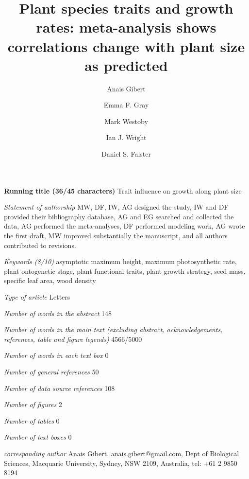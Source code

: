 \documentclass[a4paper]{article}\usepackage[]{graphicx}\usepackage[]{color}
\begin{document}
\newpage

\title{Plant species traits and growth rates: meta-analysis shows correlations change with plant size as predicted}

\author[1]{Anais Gibert}
\author[1]{Emma F. Gray}
\author[1]{Mark Westoby}
\author[1]{Ian J. Wright}
\author[1]{Daniel S. Falster}




\maketitle

\textbf{Running title (36/45 characters)} Trait influence on growth along plant size

\textit{Statement of authorship} MW, DF, IW, AG designed the study, IW and DF provided their bibliography database, AG and EG searched and collected the data, AG performed the meta-analyses, DF performed modeling work, AG wrote the first draft, MW improved substantially the manuscript, and all authors contributed to revisions.

\textit{Keywords (8/10)} asymptotic maximum height, maximum photosynthetic rate, plant ontogenetic stage, plant functional traits, plant growth strategy, seed mass, specific leaf area, wood density

\textit{Type of article} Letters

\textit{Number of words in the abstract} 148

\textit{Number of words in the main text (excluding abstract, acknowledgements, references, table and figure legends)} 4566/5000

\textit{Number of words in each text box} 0

\textit{Number of general references} 50

\textit{Number of data source references} 108

\textit{Number of figures} 2

\textit{Number of tables} 0

\textit{Number of text boxes} 0

\textit{corresponding author} Anais Gibert, anais.gibert@gmail.com, Dept of Biological Sciences, Macquarie University, Sydney, NSW 2109, Australia, tel: +61 2 9850 8194



\end{document}
